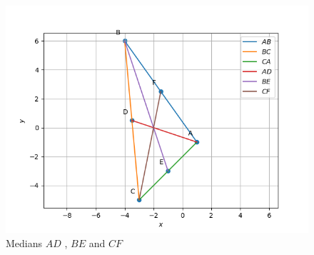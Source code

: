 \documentclass[journal,12pt,onecolumn]{IEEEtran}
\theoremstyle{remark}
\begin{document}
\begin{figure}
\includegraphics [width=\columnwidth] {./figs/figure.png}
\caption{ Medians $AD$ , $BE$ and $CF$}
\label{fig: medians}
\end{figure}
\end{document}
